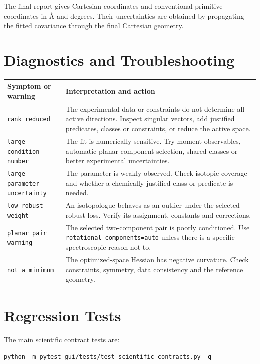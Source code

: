 \documentclass[11pt]{article}
\newcommand{\angstrom}{\text{\AA}}
\begin{document}
The final report gives Cartesian coordinates and conventional primitive
coordinates in \(\angstrom\) and degrees.  Their uncertainties are obtained by
propagating the fitted covariance through the final Cartesian geometry.

\section{Diagnostics and Troubleshooting}

\begin{longtable}{@{}p{}p{}@{}}
\toprule
Symptom or warning & Interpretation and action \\
\midrule
\endhead
\texttt{rank reduced} & The experimental data or constraints do not determine
all active directions.  Inspect singular vectors, add justified predicates,
classes or constraints, or reduce the active space. \\
\texttt{large condition number} & The fit is numerically sensitive.  Try
moment observables, automatic planar-component selection, shared classes or
better experimental uncertainties. \\
\texttt{large parameter uncertainty} & The parameter is weakly observed.
Check isotopic coverage and whether a chemically justified class or predicate
is needed. \\
\texttt{low robust weight} & An isotopologue behaves as an outlier under the
selected robust loss.  Verify its assignment, constants and corrections. \\
\texttt{planar pair warning} & The selected two-component pair is poorly
conditioned.  Use \texttt{rotational\_components=auto} unless there is a
specific spectroscopic reason not to. \\
\texttt{not a minimum} & The optimized-space Hessian has negative curvature.
Check constraints, symmetry, data consistency and the reference geometry. \\
\bottomrule
\end{longtable}

\section{Regression Tests}

The main scientific contract tests are:

\begin{lstlisting}[style=merlino]
python -m pytest gui/tests/test_scientific_contracts.py -q
\end{lstlisting}
\end{document}
